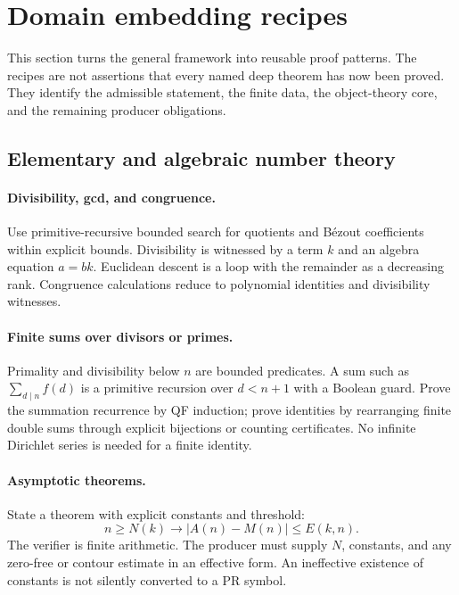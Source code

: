 \section{Domain embedding recipes}\label{sec:domains}

This section turns the general framework into reusable proof patterns.  The recipes are not assertions that every named deep theorem has now been proved.  They identify the admissible statement, the finite data, the object-theory core, and the remaining producer obligations.

\subsection{Elementary and algebraic number theory}

\paragraph{Divisibility, gcd, and congruence.}
Use primitive-recursive bounded search for quotients and Bézout coefficients within explicit bounds.  Divisibility is witnessed by a term \(k\) and an algebra equation \(a=bk\).  Euclidean descent is a loop with the remainder as a decreasing rank.  Congruence calculations reduce to polynomial identities and divisibility witnesses.

\paragraph{Finite sums over divisors or primes.}
Primality and divisibility below \(n\) are bounded predicates.  A sum such as
\(\sum_{d\mid n}f(d)\) is a primitive recursion over \(d<n+1\) with a Boolean guard.  Prove the summation recurrence by QF induction; prove identities by rearranging finite double sums through explicit bijections or counting certificates.  No infinite Dirichlet series is needed for a finite identity.

\paragraph{Asymptotic theorems.}
State a theorem with explicit constants and threshold:
\[
 n\ge N(k)\longrightarrow |A(n)-M(n)|\le E(k,n).
\]
The verifier is finite arithmetic.  The producer must supply \(N\), constants, and any zero-free or contour estimate in an effective form.  An ineffective existence of constants is not silently converted to a PR symbol.

